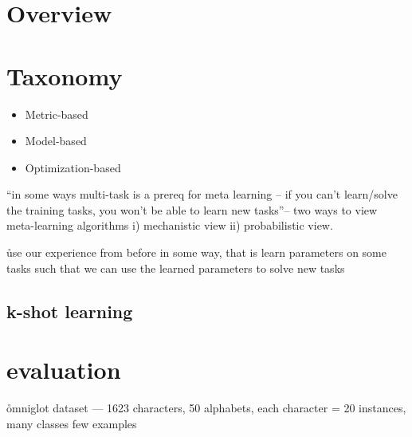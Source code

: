 \section{Overview}




\section{Taxonomy}



\begin{itemize}[noitemsep,topsep=0pt]
	\item Metric-based
	\item Model-based
	\item Optimization-based
\end{itemize}




\r{``in some ways multi-task is a prereq for meta learning -- if you can't learn/solve the training tasks, you won't be able to learn new tasks''-- two ways to view meta-learning algorithms i) mechanistic view ii) probabilistic view.}

\r{use our experience from before in some way, that is learn parameters on some tasks such that we can use the learned parameters to solve new tasks}



\subsection{k-shot learning}



\section{evaluation}

\r{omniglot dataset --- 1623 characters, 50 alphabets, each character = 20 instances, many classes few examples}


